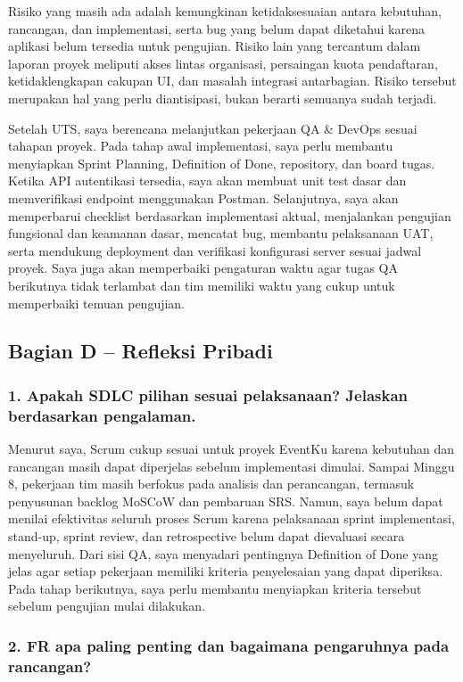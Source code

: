 \documentclass[11pt,a4paper]{article}
\begin{document}
Risiko yang masih ada adalah kemungkinan ketidaksesuaian antara kebutuhan, rancangan, dan implementasi, serta bug yang belum dapat diketahui karena aplikasi belum tersedia untuk pengujian. Risiko lain yang tercantum dalam laporan proyek meliputi akses lintas organisasi, persaingan kuota pendaftaran, ketidaklengkapan cakupan UI, dan masalah integrasi antarbagian. Risiko tersebut merupakan hal yang perlu diantisipasi, bukan berarti semuanya sudah terjadi.

Setelah UTS, saya berencana melanjutkan pekerjaan QA \& DevOps sesuai tahapan proyek. Pada tahap awal implementasi, saya perlu membantu menyiapkan Sprint Planning, Definition of Done, repository, dan board tugas. Ketika API autentikasi tersedia, saya akan membuat unit test dasar dan memverifikasi endpoint menggunakan Postman. Selanjutnya, saya akan memperbarui checklist berdasarkan implementasi aktual, menjalankan pengujian fungsional dan keamanan dasar, mencatat bug, membantu pelaksanaan UAT, serta mendukung deployment dan verifikasi konfigurasi server sesuai jadwal proyek. Saya juga akan memperbaiki pengaturan waktu agar tugas QA berikutnya tidak terlambat dan tim memiliki waktu yang cukup untuk memperbaiki temuan pengujian.


\subsection*{Bagian D -- Refleksi Pribadi}
\subsubsection*{1. Apakah SDLC pilihan sesuai pelaksanaan? Jelaskan berdasarkan pengalaman.}

Menurut saya, Scrum cukup sesuai untuk proyek EventKu karena kebutuhan dan rancangan masih dapat diperjelas sebelum implementasi dimulai. Sampai Minggu 8, pekerjaan tim masih berfokus pada analisis dan perancangan, termasuk penyusunan backlog MoSCoW dan pembaruan SRS. Namun, saya belum dapat menilai efektivitas seluruh proses Scrum karena pelaksanaan sprint implementasi, stand-up, sprint review, dan retrospective belum dapat dievaluasi secara menyeluruh. Dari sisi QA, saya menyadari pentingnya Definition of Done yang jelas agar setiap pekerjaan memiliki kriteria penyelesaian yang dapat diperiksa. Pada tahap berikutnya, saya perlu membantu menyiapkan kriteria tersebut sebelum pengujian mulai dilakukan.



\subsubsection*{2. FR apa paling penting dan bagaimana pengaruhnya pada rancangan?}
\end{document}
